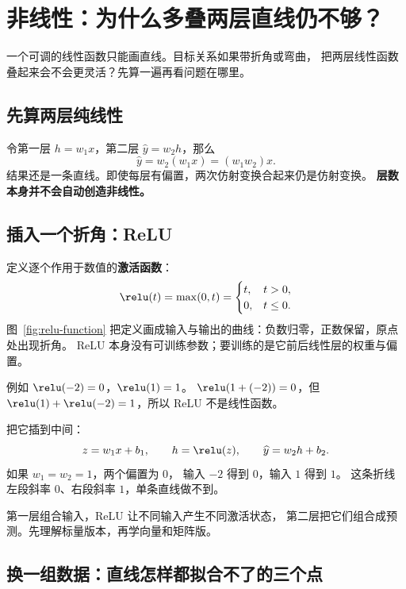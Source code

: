 \chapterrule
\section{非线性：为什么多叠两层直线仍不够？}
\label{intro:07-functions-relu}

一个可调的线性函数只能画直线。目标关系如果带折角或弯曲，
把两层线性函数叠起来会不会更灵活？先算一遍再看问题在哪里。

\subsection{先算两层纯线性}

令第一层 $h=w_1x$，第二层 $\widehat{y}=w_2h$，那么
\[
\widehat{y}=w_2(w_1x)=(w_1w_2)x.
\]
结果还是一条直线。即使每层有偏置，两次仿射变换合起来仍是仿射变换。
\textbf{层数本身并不会自动创造非线性。}

\subsection{插入一个折角：ReLU}
\label{sec:relu-piecewise}

定义逐个作用于数值的\textbf{激活函数}：
\begin{equation}
\relu(t)=\max(0,t)=
\begin{cases}t,&t>0,\\0,&t\le0.\end{cases}
\end{equation}
图~\ref{fig:relu-function} 把定义画成输入与输出的曲线：负数归零，正数保留，原点处出现折角。
ReLU 本身没有可训练参数；要训练的是它前后线性层的权重与偏置。


例如 $\relu(-2)=0$，$\relu(1)=1$。
$\relu(1+(-2))=0$，但
$\relu(1)+\relu(-2)=1$，所以 ReLU 不是线性函数。

把它插到中间：
\[
z=w_1x+b_1,\qquad h=\relu(z),\qquad
\widehat{y}=w_2h+b_2.
\]
如果 $w_1=w_2=1$，两个偏置为 $0$，
输入 $-2$ 得到 $0$，输入 $1$ 得到 $1$。
这条折线左段斜率 $0$、右段斜率 $1$，单条直线做不到。

\begin{idea}
第一层组合输入，ReLU 让不同输入产生不同激活状态，
第二层把它们组合成预测。先理解标量版本，再学向量和矩阵版。
\end{idea}

\subsection{换一组数据：直线怎样都拟合不了的三个点}
\label{experiment:relu-fit}


